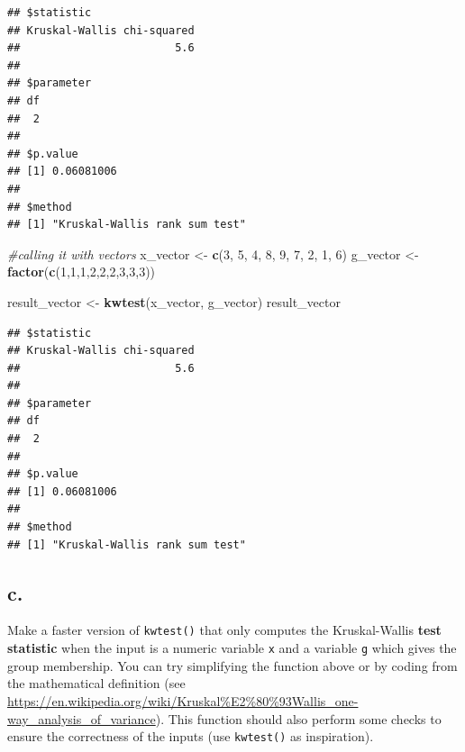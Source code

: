 \documentclass[
]{article}
\newenvironment{Shaded}{\begin{snugshade}}{\end{snugshade}}
\newcommand{\CommentTok}[1]{\textcolor[rgb]{0.56,0.35,0.01}{\textit{#1}}}
\newcommand{\DecValTok}[1]{\textcolor[rgb]{0.00,0.00,0.81}{#1}}
\newcommand{\FunctionTok}[1]{\textcolor[rgb]{0.13,0.29,0.53}{\textbf{#1}}}
\newcommand{\NormalTok}[1]{#1}
\newcommand{\OtherTok}[1]{\textcolor[rgb]{0.56,0.35,0.01}{#1}}
\begin{document}
\begin{verbatim}
## $statistic
## Kruskal-Wallis chi-squared 
##                        5.6 
## 
## $parameter
## df 
##  2 
## 
## $p.value
## [1] 0.06081006
## 
## $method
## [1] "Kruskal-Wallis rank sum test"
\end{verbatim}

\begin{Shaded}
\begin{Highlighting}[]
\CommentTok{\#calling it with vectors}
\NormalTok{x\_vector }\OtherTok{\textless{}{-}} \FunctionTok{c}\NormalTok{(}\DecValTok{3}\NormalTok{, }\DecValTok{5}\NormalTok{, }\DecValTok{4}\NormalTok{, }\DecValTok{8}\NormalTok{, }\DecValTok{9}\NormalTok{, }\DecValTok{7}\NormalTok{, }\DecValTok{2}\NormalTok{, }\DecValTok{1}\NormalTok{, }\DecValTok{6}\NormalTok{)}
\NormalTok{g\_vector }\OtherTok{\textless{}{-}} \FunctionTok{factor}\NormalTok{(}\FunctionTok{c}\NormalTok{(}\DecValTok{1}\NormalTok{,}\DecValTok{1}\NormalTok{,}\DecValTok{1}\NormalTok{,}\DecValTok{2}\NormalTok{,}\DecValTok{2}\NormalTok{,}\DecValTok{2}\NormalTok{,}\DecValTok{3}\NormalTok{,}\DecValTok{3}\NormalTok{,}\DecValTok{3}\NormalTok{))}

\NormalTok{result\_vector }\OtherTok{\textless{}{-}} \FunctionTok{kwtest}\NormalTok{(x\_vector, g\_vector)}
\NormalTok{result\_vector}
\end{Highlighting}
\end{Shaded}

\begin{verbatim}
## $statistic
## Kruskal-Wallis chi-squared 
##                        5.6 
## 
## $parameter
## df 
##  2 
## 
## $p.value
## [1] 0.06081006
## 
## $method
## [1] "Kruskal-Wallis rank sum test"
\end{verbatim}

\subsection{c.~}\label{c.-5}

Make a faster version of \texttt{kwtest()} that only computes the
Kruskal-Wallis \textbf{test statistic} when the input is a numeric
variable \texttt{x} and a variable \texttt{g} which gives the group
membership. You can try simplifying the function above or by coding from
the mathematical definition (see
\url{https://en.wikipedia.org/wiki/Kruskal\%E2\%80\%93Wallis_one-way_analysis_of_variance}).
This function should also perform some checks to ensure the correctness
of the inputs (use \texttt{kwtest()} as inspiration).
\end{document}
